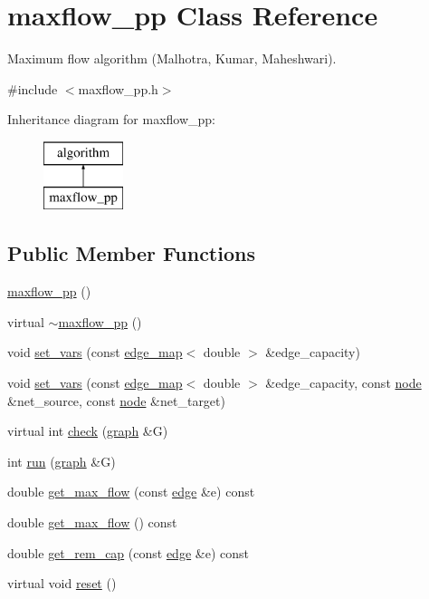 \hypertarget{classmaxflow__pp}{}\section{maxflow\+\_\+pp Class Reference}
\label{classmaxflow__pp}


Maximum flow algorithm (Malhotra, Kumar, Maheshwari).  




{\ttfamily \#include $<$maxflow\+\_\+pp.\+h$>$}

Inheritance diagram for maxflow\+\_\+pp\+:\begin{figure}[H]
\begin{center}
\leavevmode
\includegraphics[height=2.000000cm]{classmaxflow__pp}
\end{center}
\end{figure}
\subsection*{Public Member Functions}
\begin{DoxyCompactItemize}
\item 
\mbox{\hyperlink{classmaxflow__pp_a29ec393f72f3289c49a79b0da17e3ccd}{maxflow\+\_\+pp}} ()
\item 
virtual \mbox{\hyperlink{classmaxflow__pp_a2f96bfeea4cb2c044d155d356d72452a}{$\sim$maxflow\+\_\+pp}} ()
\item 
void \mbox{\hyperlink{classmaxflow__pp_ac77f4c613efe7857e053f9bfb103dc3e}{set\+\_\+vars}} (const \mbox{\hyperlink{classedge__map}{edge\+\_\+map}}$<$ double $>$ \&edge\+\_\+capacity)
\item 
void \mbox{\hyperlink{classmaxflow__pp_a13756f76387cc114b88a44e324fc93ae}{set\+\_\+vars}} (const \mbox{\hyperlink{classedge__map}{edge\+\_\+map}}$<$ double $>$ \&edge\+\_\+capacity, const \mbox{\hyperlink{classnode}{node}} \&net\+\_\+source, const \mbox{\hyperlink{classnode}{node}} \&net\+\_\+target)
\item 
virtual int \mbox{\hyperlink{classmaxflow__pp_a7ea24bd88999718e5e4e28ac028131cd}{check}} (\mbox{\hyperlink{classgraph}{graph}} \&G)
\item 
int \mbox{\hyperlink{classmaxflow__pp_a07c7cb1ae5db23d87cf49ce7769b2814}{run}} (\mbox{\hyperlink{classgraph}{graph}} \&G)
\item 
double \mbox{\hyperlink{classmaxflow__pp_ac561a61619f363ef5d9b8fc5cfb10a5f}{get\+\_\+max\+\_\+flow}} (const \mbox{\hyperlink{classedge}{edge}} \&e) const
\item 
double \mbox{\hyperlink{classmaxflow__pp_a72210f8ac7aeca0a58e7407681003083}{get\+\_\+max\+\_\+flow}} () const
\item 
double \mbox{\hyperlink{classmaxflow__pp_ab3af0c0568ff2c8295166bfd75736169}{get\+\_\+rem\+\_\+cap}} (const \mbox{\hyperlink{classedge}{edge}} \&e) const
\item 
virtual void \mbox{\hyperlink{classmaxflow__pp_a2179764baf624f1414211f3a7181b1a0}{reset}} ()
\end{DoxyCompactItemize}
